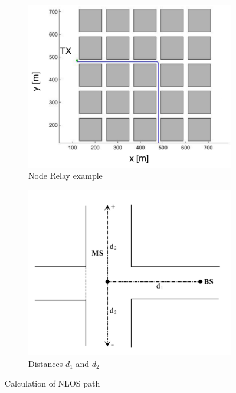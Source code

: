 \begin{figure}
\centering
\begin{subfigure}{.5\textwidth}
  \centering
  \includegraphics[width=1\linewidth]{figures/node_relay}
  \caption{Node Relay example \cite{Raschkowski}}
  \label{fig:node_relay}
\end{subfigure}%
\begin{subfigure}{.5\textwidth}
  \centering
  \includegraphics[width=1\linewidth]{figures/d1_d2}
  \caption{Distances $d_1$ and $d_2$ \cite{Meinila2009}}
  \label{fig:d1_d2}
\end{subfigure}
\caption{Calculation of NLOS path}
\label{fig:nlos_path}
\end{figure}

